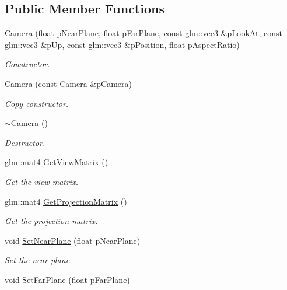 \subsection*{Public Member Functions}
\begin{DoxyCompactItemize}
\item 
\hyperlink{class_camera_a246cabccf28926268878ea4aa52d9422}{Camera} (float p\+Near\+Plane, float p\+Far\+Plane, const glm\+::vec3 \&p\+Look\+At, const glm\+::vec3 \&p\+Up, const glm\+::vec3 \&p\+Position, float p\+Aspect\+Ratio)
\begin{DoxyCompactList}\small\item\em Constructor. \end{DoxyCompactList}\item 
\hyperlink{class_camera_ace95ed720c0b2ae17f864e5571bec3b3}{Camera} (const \hyperlink{class_camera}{Camera} \&p\+Camera)
\begin{DoxyCompactList}\small\item\em Copy constructor. \end{DoxyCompactList}\item 
\hyperlink{class_camera_ad1897942d0ccf91052386388a497349f}{$\sim$\+Camera} ()
\begin{DoxyCompactList}\small\item\em Destructor. \end{DoxyCompactList}\item 
glm\+::mat4 \hyperlink{class_camera_affa333055635aed96518c4c66be9a70c}{Get\+View\+Matrix} ()
\begin{DoxyCompactList}\small\item\em Get the view matrix. \end{DoxyCompactList}\item 
glm\+::mat4 \hyperlink{class_camera_ab0a4bf5a65d45f25529e3cffda1c361b}{Get\+Projection\+Matrix} ()
\begin{DoxyCompactList}\small\item\em Get the projection matrix. \end{DoxyCompactList}\item 
void \hyperlink{class_camera_ab60a7a6dbd2cd2f2256bebf2c980b4be}{Set\+Near\+Plane} (float p\+Near\+Plane)
\begin{DoxyCompactList}\small\item\em Set the near plane. \end{DoxyCompactList}\item 
void \hyperlink{class_camera_a74628da605b4594acad8b48c6ed6907a}{Set\+Far\+Plane} (float p\+Far\+Plane)

\end{DoxyCompactItemize}
